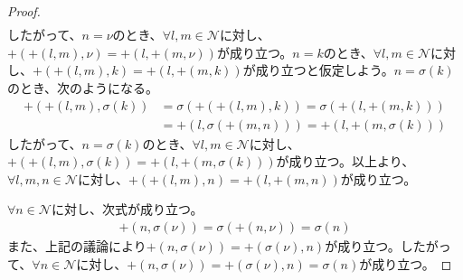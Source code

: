 \documentclass[dvipdfmx]{jsarticle}
\begin{document}
\begin{proof}
\begin{align*}
\end{align*}
したがって、$n = \nu$のとき、$\forall l,m \in \mathcal{N}$に対し、$+ \left( + (l,m),\nu \right) = + \left( l, + (m,\nu) \right)$が成り立つ。$n = k$のとき、$\forall l,m \in \mathcal{N}$に対し、$+ \left( + (l,m),k \right) = + \left( l, + (m,k) \right)$が成り立つと仮定しよう。$n = \sigma(k)$のとき、次のようになる。
\begin{align*}
+ \left( + (l,m),\sigma(k) \right) &= \sigma\left( + \left( + (l,m),k \right) \right) = \sigma\left( + \left( l, + (m,k) \right) \right)\\
&= + \left( l,\sigma\left( + (m,n) \right) \right) = + \left( l, + \left( m,\sigma(k) \right) \right)
\end{align*}
したがって、$n = \sigma(k)$のとき、$\forall l,m \in \mathcal{N}$に対し、$+ \left( + (l,m),\sigma(k) \right) = + \left( l, + \left( m,\sigma(k) \right) \right)$が成り立つ。以上より、$\forall l,m,n \in \mathcal{N}$に対し、$+ \left( + (l,m),n \right) = + \left( l, + (m,n) \right)$が成り立つ。\par
$\forall n \in \mathcal{N}$に対し、次式が成り立つ。
\begin{align*}
+ \left( n,\sigma(\nu) \right) = \sigma\left( + (n,\nu) \right) = \sigma(n)
\end{align*}
また、上記の議論により$+ \left( n,\sigma(\nu) \right) = + \left( \sigma(\nu),n \right)$が成り立つ。したがって、$\forall n \in \mathcal{N}$に対し、$+ \left( n,\sigma(\nu) \right) = + \left( \sigma(\nu),n \right) = \sigma(n)$が成り立つ。
\end{proof}
\end{document}
